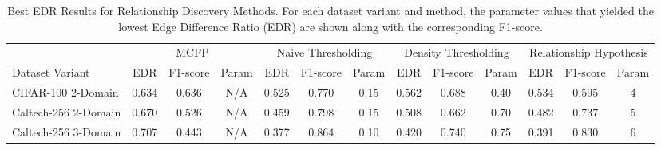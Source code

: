 \begin{table}[ht]
\caption{Best EDR Results for Relationship Discovery Methods. For each dataset variant and method, the parameter values that yielded the lowest Edge Difference Ratio (EDR) are shown along with the corresponding F1-score.}
\label{tab:relationship_methods_best_edr}
\begin{tabular}{lcccccccccccc}
\toprule
& \multicolumn{3}{c}{MCFP} & \multicolumn{3}{c}{Naive Thresholding} & \multicolumn{3}{c}{Density Thresholding} & \multicolumn{3}{c}{Relationship Hypothesis} \\
Dataset Variant & EDR & F1-score & Param & EDR & F1-score & Param & EDR & F1-score & Param & EDR & F1-score & Param \\
\midrule
CIFAR-100 2-Domain & 0.634 & 0.636 & N/A & 0.525 & 0.770 & 0.15 & 0.562 & 0.688 & 0.40 & 0.534 & 0.595 & 4 \\
Caltech-256 2-Domain & 0.670 & 0.526 & N/A & 0.459 & 0.798 & 0.15 & 0.508 & 0.662 & 0.70 & 0.482 & 0.737 & 5 \\
Caltech-256 3-Domain & 0.707 & 0.443 & N/A & 0.377 & 0.864 & 0.10 & 0.420 & 0.740 & 0.75 & 0.391 & 0.830 & 6 \\
\bottomrule
\end{tabular}
\end{table}
